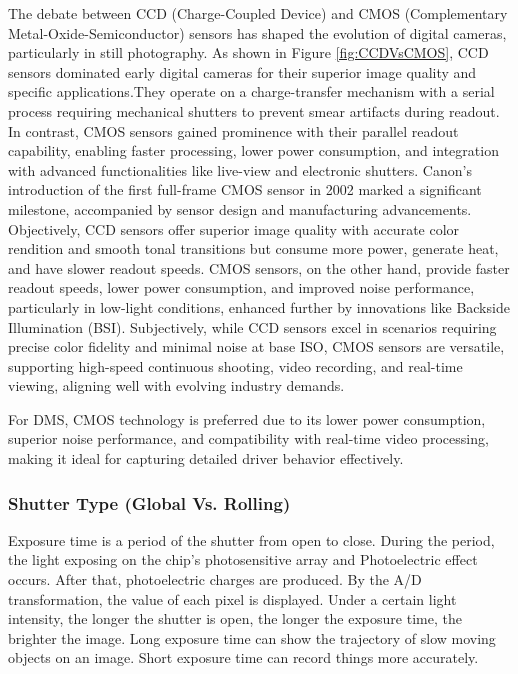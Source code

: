 The debate between CCD (Charge-Coupled Device) and CMOS (Complementary Metal-Oxide-Semiconductor) sensors has shaped the evolution of digital cameras, particularly in still photography. As shown in Figure \ref{fig:CCDVsCMOS}, CCD sensors dominated early digital cameras for their superior image quality and specific applications.They operate on a charge-transfer mechanism with a serial process requiring mechanical shutters to prevent smear artifacts during readout. In contrast, CMOS sensors gained prominence with their parallel readout capability, enabling faster processing, lower power consumption, and integration with advanced functionalities like live-view and electronic shutters. Canon's introduction of the first full-frame CMOS sensor in 2002 marked a significant milestone, accompanied by sensor design and manufacturing advancements. Objectively, CCD sensors offer superior image quality with accurate color rendition and smooth tonal transitions but consume more power, generate heat, and have slower readout speeds. CMOS sensors, on the other hand, provide faster readout speeds, lower power consumption, and improved noise performance, particularly in low-light conditions, enhanced further by innovations like Backside Illumination (BSI). Subjectively, while CCD sensors excel in scenarios requiring precise color fidelity and minimal noise at base ISO, CMOS sensors are versatile, supporting high-speed continuous shooting, video recording, and real-time viewing, aligning well with evolving industry demands.

For DMS, CMOS technology is preferred due to its lower power consumption, superior noise performance, and compatibility with real-time video processing, making it ideal for capturing detailed driver behavior effectively.

\subsubsection{\textbf{Shutter Type} (Global Vs. Rolling)}
Exposure time is a period of the shutter from open to close. During the period, the light exposing on the chip’s photosensitive array and Photoelectric effect occurs. After that, photoelectric charges are produced. By the A/D transformation, the value of each pixel is displayed. Under a certain light intensity, the longer the shutter is open, the longer the exposure time, the brighter the image. Long exposure time can show the trajectory of slow moving objects on an image. Short exposure time can record things more accurately. 

